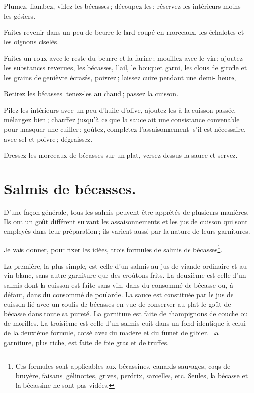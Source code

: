 Plumez, flambez, videz les bécasses ; découpez-les ; réservez les intérieurs
moins les gésiers.

Faites revenir dans un peu de beurre le lard coupé en morceaux, les échalotes
et les oignons ciselés.

Faites un roux avec le reste du beurre et la farine ; mouillez avec le vin ;
ajoutez les substances revenues, les bécasses, l'ail, le bouquet garni, les
clous de girofle et les grains de genièvre écrasés, poivrez ; laissez cuire
pendant une demi- heure,

Retirez les bécasses, tenez-les au chaud ; passez la cuisson.

Pilez les intérieurs avec un peu d'huile d'olive, ajoutez-les à la cuisson
passée, mélangez bien ; chauffez jusqu'à ce que la sauce ait une consistance
convenable pour masquer une cuiller ; goûtez, complétez l'assaisonnement, s'il
est nécessaire, avec sel et poivre ; dégraissez.

Dressez les morceaux de bécasses sur un plat, versez dessus la sauce et servez.

\section*{\centering Salmis de bécasses.}
{}
\label{pg0630} \hypertarget{p0630}{}

D'une façon générale, tous les salmis peuvent être apprêtés de plusieurs
manières. Ils ont un goût différent suivant les assaisonnements et les jus de
cuisson qui sont employés dans leur préparation ; ils varient aussi par la
nature de leurs garnitures.

Je vais donner, pour fixer les idées, trois formules de salmis de
bécasses\footnote{Ces formules sont applicables aux bécassines, canards
sauvages, coqs de bruyère, faisans, gélinottes, grives, perdrix, sarcelles,
etc. Seules, la bécasse et la bécassine ne sont pas vidées.}.

\medskip

La première, la plus simple, est celle d’un salmis au jus de viande ordinaire
et au vin blanc, sans autre garniture que des croûtons frits. La deuxième est
celle d'un salmis dont la cuisson est faite sans vin, dans du consommé de
bécasse ou, à défaut, dans du consommé de poularde. La sauce est constituée par
le jus de cuisson lié avec un coulis de bécasses en vue de conserver au plat le
goût de bécasse dans toute sa pureté. La garniture est faite de champignons de
couche ou de morilles. La troisième est celle d'un salmis cuit dans un fond
identique à celui de la deuxième formule, corsé avec du madère et du fumet de
gibier. La garniture, plus riche, est faite de foie gras et de truffes.

